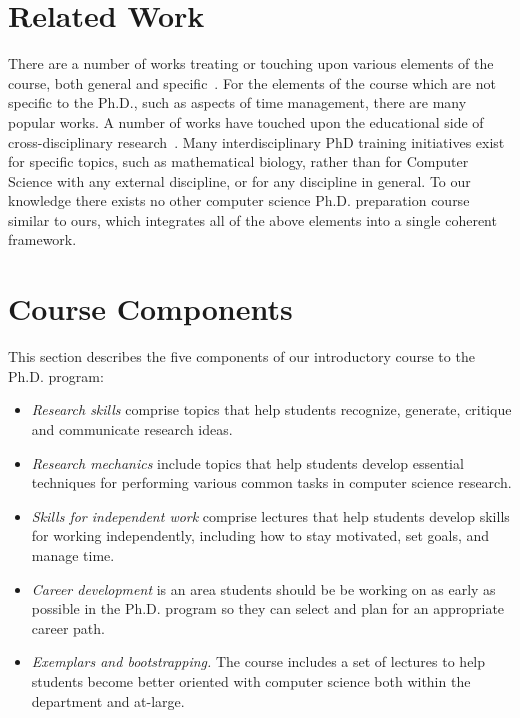 \section{Related Work}\label{sec:related}

There are a number of works treating or touching upon various elements
of the course, both general and
specific~\cite{phd-not-enough,reshaping-grad-educ,grad-school-survival,
  unwritten-rules,art-sci-investigation,creativity-in-science,res-students-guide}.
For the elements of the course which are not specific to the Ph.D., such
as aspects of time management, there are many popular works.  A number
of works have touched upon the educational side of cross-disciplinary
research~\cite{work-at-boundaries,facilitating-interdisc,
  grand-unif-interdisc,discourse-anal-cross-disc}.  Many
interdisciplinary PhD training initiatives exist for specific topics,
such as mathematical biology, rather than for Computer Science with any
external discipline, or for any discipline in general.  To our knowledge
there exists no other computer science Ph.D. preparation course similar
to ours, which integrates all of the above elements into a single
coherent framework.

\section{Course Components}\label{sec:components}

This section describes the five components of our introductory course
to the Ph.D. program:
\begin{itemize}
\itemsep=-1pt
\item {\em Research skills} comprise topics that help students
  recognize, generate, critique and communicate research ideas.
\item {\em Research mechanics} include topics that help students develop
  essential techniques for performing various common tasks in computer
  science research.
\item {\em Skills for independent work} comprise lectures that help
  students develop skills for working independently, including how to stay
  motivated, set goals, and manage time.
\item {\em Career development} is an area students should be be working
  on as early as possible in the Ph.D. program so they can select and
  plan for an appropriate career path.
\item {\em Exemplars and bootstrapping.} The course includes a set of
  lectures to help students become better oriented with computer science
  both within the department and at-large.
\end{itemize}

